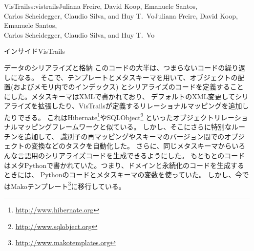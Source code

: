 \begin{aosachaptertoc}{VisTrails}{s:vistrails}{Juliana Freire, David Koop, Emanuele Santos, \\ Carlos Scheidegger, Claudio Silva, and Huy T.\ Vo}{Juliana Freire, David Koop, Emanuele Santos, \\ \hspace*{0.9cm} Carlos Scheidegger, Claudio Silva, and Huy T.\ Vo}
\begin{aosasect1}{インサイドVisTrails}
\begin{aosasect2}{データのシリアライズと格納}
このコードの大半は、つまらないコードの繰り返しになる。
そこで、テンプレートとメタスキーマを用いて、オブジェクトの配置(およびメモリ内でのインデックス)
とシリアライズのコードを定義することにした。メタスキーマはXMLで書かれており、
デフォルトのXML変更してシリアライズを拡張したり、VisTrailsが定義するリレーショナルマッピングを追加したりできる。
これはHibernate\footnote{\url{http://www.hibernate.org}}やSQLObject\footnote{\url{http://www.sqlobject.org}}
といったオブジェクトリレーショナルマッピングフレームワークと似ている。
しかし、そこにさらに特別なルーチンを追加して、
識別子の再マッピングやスキーマのバージョン間でのオブジェクトの変換などのタスクを自動化した。
さらに、同じメタスキーマからいろんな言語用のシリアライズコードを生成できるようにした。
もともとのコードはメタPythonで書かれていた。つまり、ドメインと永続化のコードを生成するときには、
Pythonのコードとメタスキーマの変数を使っていた。
しかし、今ではMakoテンプレート\footnote{\url{http://www.makotemplates.org}}に移行している。


\end{aosasect2}
\end{aosasect1}
\end{aosachaptertoc}
